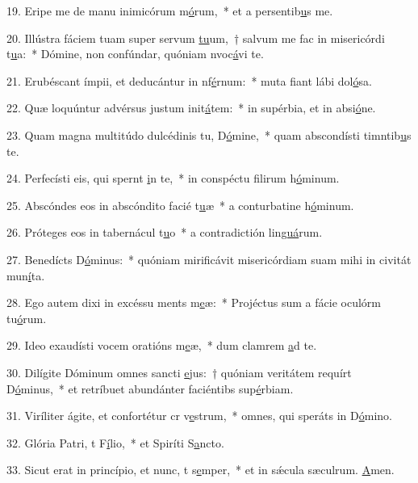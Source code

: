 19. Eripe me de manu inimicórum m\uline{ó}rum,~* et a persentib\uline{u}s me.\par 
20. Illústra fáciem tuam super servum \uline{tu}um,~† salvum me fac in misericórdi t\uline{u}a:~* Dómine, non confúndar, quóniam nvoc\uline{á}vi te.\par 
21. Erubéscant ímpii, et deducántur in nf\uline{é}rnum:~* muta fiant lábi dol\uline{ó}sa.\par 
22. Quæ loquúntur advérsus justum init\uline{á}tem:~* in supérbia, et in absi\uline{ó}ne.\par 
23. Quam magna multitúdo dulcédinis tu, D\uline{ó}mine,~* quam abscondísti timntib\uline{u}s te.\par 
24. Perfecísti eis, qui spernt \uline{i}n te,~* in conspéctu filirum h\uline{ó}minum.\par 
25. Abscóndes eos in abscóndito facié t\uline{u}æ~* a conturbatine h\uline{ó}minum.\par 
26. Próteges eos in tabernácul t\uline{u}o~* a contradictión lin\uline{guá}rum.\par 
27. Benedícts D\uline{ó}minus:~* quóniam mirificávit misericórdiam suam mihi in civitát mun\uline{í}ta.\par 
28. Ego autem dixi in excéssu ments m\uline{e}æ:~* Projéctus sum a fácie oculórm tu\uline{ó}rum.\par 
29. Ideo exaudísti vocem oratións m\uline{e}æ,~* dum clamrem \uline{a}d te.\par 
30. Dilígite Dóminum omnes sancti \uline{e}jus:~† quóniam veritátem requírt D\uline{ó}minus,~* et retríbuet abundánter faciéntibs sup\uline{é}rbiam.\par 
31. Viríliter ágite, et confortétur cr v\uline{e}strum,~* omnes, qui speráts in D\uline{ó}mino.\par 
32. Glória Patri, t F\uline{í}lio,~* et Spiríti S\uline{a}ncto.\par 
33. Sicut erat in princípio, et nunc, t s\uline{e}mper,~* et in sǽcula sæculrum. \uline{A}men.\par 
